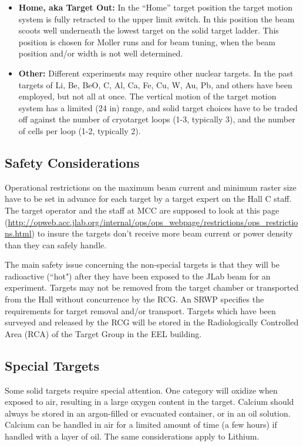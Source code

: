 {\begin{itemize}
\item {\bf Home, aka Target Out:} In the ``Home'' target position the
  target motion system is fully retracted to the upper limit
  switch. In this position the beam scoots well underneath the lowest
  target on the solid target ladder. This position is chosen for
  Moller runs and for beam tuning, when the beam position and/or width
  is not well determined.

\item {\bf Other:} Different experiments may require other nuclear
  targets. In the past targets of Li, Be, BeO, C, Al, Ca, Fe, Cu, W,
  Au, Pb, and others have been employed, but not all at once. The
  vertical motion of the target motion system has a limited (24 in)
  range, and solid target choices have to be traded off against the
  number of cryotarget loops (1-3, typically 3), and the number of
  cells per loop (1-2, typically 2).

\end{itemize}

\subsection{Safety Considerations}
Operational restrictions on the maximum beam current and minimum
raster size have to be set in advance for each target by a target
expert on the Hall C staff. The target operator and the staff at MCC
are supposed to look at this page
(\url{http://opweb.acc.jlab.org/internal/ops/ops_webpage/restrictions/ops_restrictions.html})
to insure the targets don't receive more beam current or power density
than they can safely handle.


The main safety issue concerning the non-special targets is that they
will be radioactive (``hot") after they have been exposed to the JLab
beam for an experiment.  Targets may not be removed from the target
chamber or transported from the Hall without concurrence by the
RCG. An SRWP specifies the requirements for target removal and/or
transport. Targets which have been surveyed and released by the RCG
will be stored in the Radiologically Controlled Area (RCA) of the
Target Group in the EEL building.


\subsection{Special Targets}

Some solid targets require special attention. One category will
oxidize when exposed to air, resulting in a large oxygen content in
the target.  Calcium should always be stored in an argon-filled or
evacuated container, or in an oil solution. Calcium can be handled in
air for a limited amount of time (a few hours) if handled with a layer
of oil. The same considerations apply to Lithium.

}
